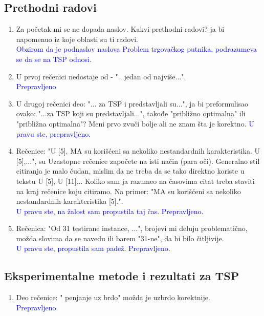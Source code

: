 \documentclass[a4paper]{report}
\newcommand{\odgovor}[1]{\textcolor{blue}{#1}}
\begin{document}
\subsection{Prethodni radovi}
\begin{enumerate}
  \item Za početak mi se ne dopada naslov. Kakvi prethodni radovi? ja bi napomenuo iz koje oblasti su ti radovi. \\
  \odgovor{ Obzirom da je podnaslov naslova Problem trgovačkog putnika, podrazumeva se da se na TSP odnosi.} 
  
  \item U prvoj rečenici nedostaje od -  "...jedan od najviše...".\\
  \odgovor{ Prepravljeno }
  \item U drugoj rečenici deo: "... za TSP i predstavljali su...", ja bi preformulisao ovako:  "...za TSP koji su predstavljali...", takođe "približno optimalna" ili "približna optimalna"? Meni prvo zvuči bolje ali ne znam šta je korektno.
  \odgovor {U pravu ste, prepravljeno. }
  
  \item Rečenice: "U [5], MA su korišćeni sa nekoliko nestandardnih karakteristika. U
[5],...", su Uzastopne rečenice započete na isti način (para oči). Generalno stil citiranja je malo čudan, mislim da ne treba da se tako direktno koriste u tekstu 
U [5], U [11]... Koliko sam ja razumeo na časovima citat treba staviti na kraj rečenice koju citiramo. Na primer: "MA su korišćeni sa nekoliko nestandardnih karakteristika [5].". \\
 \odgovor{ U pravu ste, na žalost sam propustila taj čas. Prepravljeno.}

  \item Rečenica: "Od 31 testirane instance, ...", brojevi mi deluju problematično, možda slovima da se navedu ili barem "31-ne", da bi bilo čitljivije.\\
  \odgovor{U pravu ste, propustila sam padež. Prepravljeno.}
\end{enumerate}

\subsection{Eksperimentalne metode i rezultati za TSP}
\begin{enumerate}
  \item Deo rečenice: " penjanje uz brdo" možda je uzbrdo korektnije. \\
  \odgovor{ Prepravljeno.}
  
\end{enumerate}
\end{document}
